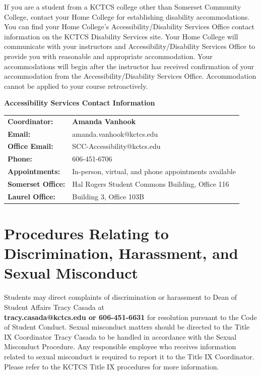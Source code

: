If you are a student from a KCTCS college other than Somerset Community College, contact your Home College for establishing disability accommodations. You can find your Home College's Accessibility/Disability Services Office contact information on the KCTCS Disability Services site. Your Home College will communicate with your instructors and Accessibility/Disability Services Office to provide you with reasonable and appropriate accommodation. Your accommodations will begin after the instructor has received confirmation of your accommodation from the Accessibility/Disability Services Office. Accommodation cannot be applied to your course retroactively.

\begin{tcolorbox}[coursetip]
{\bfseries Accessibility Services Contact Information}

\vspace{0.3em}

\renewcommand{\arraystretch}{1.1}
\begin{tabularx}{\linewidth}{@{}>{\bfseries}l X@{}}
Coordinator: & \textbf{Amanda Vanhook} \\
Email: & amanda.vanhook@kctcs.edu \\
Office Email: & SCC-Accessibility@kctcs.edu \\
Phone: & 606-451-6706 \\
Appointments: & In-person, virtual, and phone appointments available \\
Somerset Office: & Hal Rogers Student Commons Building, Office 116 \\
Laurel Office: & Building 3, Office 103B \\
\end{tabularx}

\end{tcolorbox}

\section*{Procedures Relating to Discrimination, Harassment, and Sexual Misconduct}

Students may direct complaints of discrimination or harassment to Dean of Student Affairs Tracy Casada at \\
\textbf{tracy.casada@kctcs.edu or 606-451-6631} for resolution pursuant to the Code of Student Conduct. Sexual misconduct matters should be directed to the Title IX Coordinator Tracy Casada to be handled in accordance with the Sexual Misconduct Procedure. Any responsible employee who receives information related to sexual misconduct is required to report it to the Title IX Coordinator. Please refer to the KCTCS Title IX procedures for more information.

